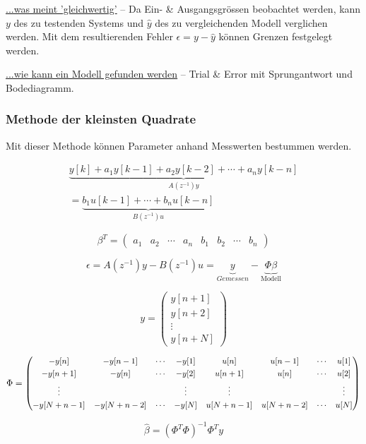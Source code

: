 \documentclass[
  10pt,
  a4paper,
]{article}
\numberwithin{equation}{section}
\begin{document}
\begin{multicols}{2}
\underline{\footnotesize{...was meint 'gleichwertig'}} -- Da Ein- \&
Ausgangsgrössen beobachtet werden, kann \(y\) des zu testenden Systems
und \(\hat{y}\) des zu vergleichenden Modell verglichen werden. Mit dem
resultierenden Fehler \(\epsilon = y - \hat{y}\) können Grenzen
festgelegt werden.

\underline{\footnotesize{...wie kann ein Modell gefunden werden}} --
Trial \& Error mit Sprungantwort und Bodediagramm.

\hypertarget{methode-der-kleinsten-quadrate}{%
\subsubsection{Methode der kleinsten
Quadrate}\label{methode-der-kleinsten-quadrate}}

Mit dieser Methode können Parameter anhand Messwerten bestummen werden.

\[
\begin{array}{r}
\underbrace{y[k]+a_1y[k-1]+a_2y[k-2]+\cdots+a_ny[k-n]}_{A(z^{-1})y}\\
= \underbrace{b_1u[k-1]+\cdots+b_nu[k-n]}_{B(z^{-1})u}
\end{array}
\]

\[
\beta^T=\begin{pmatrix}
a_1 & a_2 & \cdots & a_n & b_1 & b_2 & \cdots & b_n
\end{pmatrix}
\]

\[
\epsilon = A(z^{-1})y-B(z^{-1})u = \underbrace{y}_{Gemessen}-\underbrace{\Phi\beta}_{\text{Modell}}
\]

\[
y = \begin{pmatrix}
  y[n+1]\\
  y[n+2]\\
  \vdots\\
  y[n+N]
\end{pmatrix}
\]

\[
\small{
\Phi = \begin{pmatrix}
-y[n] & -y[n-1] & \cdots & -y[1] & u[n] & u[n-1] & \cdots & u[1] \\[1mm]
-y[n+1] & -y[n] & \cdots & -y[2] & u[n+1] & u[n] & \cdots & u[2] \\[1mm]
\vdots &  &   & \vdots & \vdots &   &   & \vdots \\[1mm]
-y[N+n-1] & -y[N+n-2] & \cdots & -y[N] & u[N+n-1] & u[N+n-2] & \cdots & u[N] \\
\end{pmatrix}}
\]

\[
\hat{\beta} = (\Phi^T\Phi)^{-1}\Phi^Ty
\]


\end{multicols}
\end{document}
